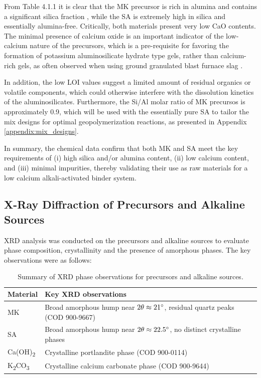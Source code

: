 From Table 4.1.1 it is clear that the MK precursor is rich in alumina and contains a significant silica fraction , while the SA is extremely high in silica and essentially alumina-free.
Critically, both materials present very low CaO contents.
The minimal presence of calcium oxide is an important indicator of the low-calcium nature of the precursors, which is a pre-requisite for favoring the formation of potassium aluminosilicate hydrate type gels, rather than calcium-rich gels, as often observed when using ground granulated blast furnace slag \cite{ali2023geopolymer}.


In addition, the low LOI values suggest a limited amount of residual organics or volatile components, which could otherwise interfere with the dissolution kinetics of the aluminosilicates.
Furthermore, the Si/Al molar ratio of MK precursos is approximately 0.9, which will be used with the essentially pure SA to tailor the mix designs for optimal geopolymerization reactions, as presented in Appendix \ref{appendix:mix_designs}.

In summary, the chemical data confirm that both MK and SA meet the key requirements of (i) high silica and/or alumina content, (ii) low calcium content, and (iii) minimal impurities, thereby validating their use as raw materials for a low calcium alkali-activated binder system.

\subsection{X-Ray Diffraction of Precursors and Alkaline Sources}
\label{sec:x-ray_diffraction_of_precursors_and_alkaline_sources}

XRD analysis was conducted on the precursors and alkaline sources to evaluate phase composition, crystallinity and the presence of amorphous phases. The key observations were as follows:

\begin{table}[H]
    \centering
    \caption{Summary of XRD phase observations for precursors and alkaline sources.}
    \label{tab:precursor_xrd_summary}
    \begin{tabular}{l l}
        \hline
        Material & Key XRD observations \\
        \hline
        MK & Broad amorphous hump near $2\theta \approx 21^{\circ}$, residual quartz peaks (COD 900-9667) \\
        SA & Broad amorphous hump near $2\theta \approx 22.5^{\circ}$, no distinct crystalline phases \\
        Ca(OH)\textsubscript{2} & Crystalline portlandite phase (COD 900-0114) \\
        K\textsubscript{2}CO\textsubscript{3} & Crystalline calcium carbonate phase (COD 900-9644) \\
        \hline
    \end{tabular}
\end{table}

